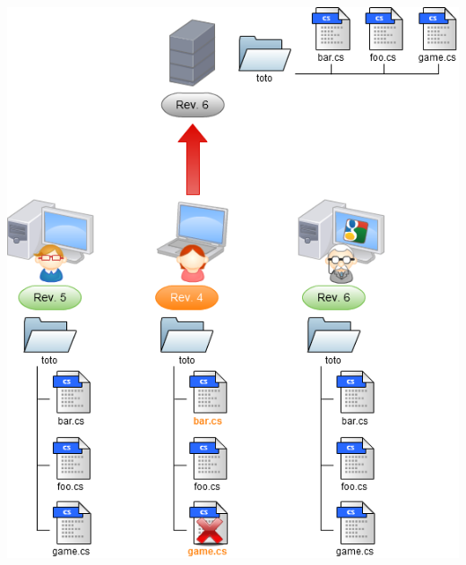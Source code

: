 \begin{frame}
  \begin{center}
    \includegraphics[scale=0.3]{images/8-Commit3.png}
  \end{center}
\end{frame}

